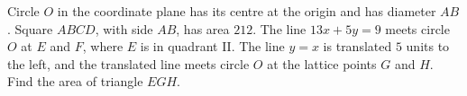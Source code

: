 Circle $O$ in the coordinate plane has its centre at the origin and has diameter $AB$. Square $ABCD$, with side $AB$, has area $212$. The line $13x+5y=9$ meets circle $O$ at $E$ and $F$, where $E$ is in quadrant II. The line $y=x$ is translated $5$ units to the left, and the translated line meets circle $O$ at the lattice points $G$ and $H$. Find the area of triangle $EGH$.
